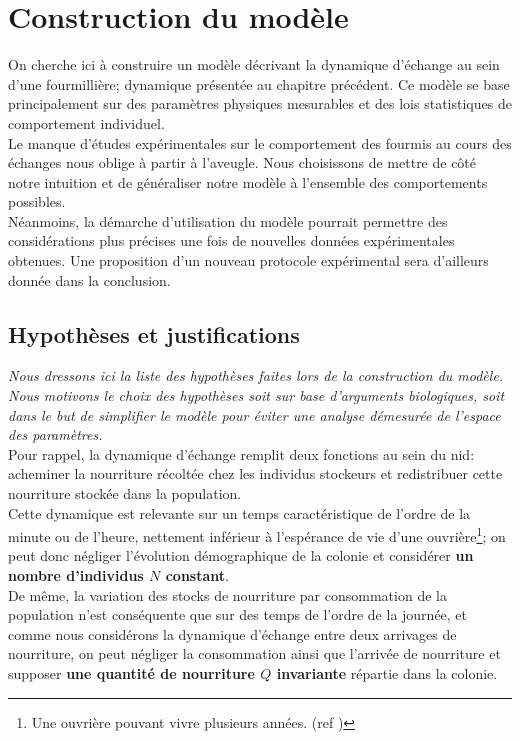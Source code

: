\chapter{Construction du modèle}

On cherche ici à construire un modèle décrivant la dynamique d'échange au sein d'une fourmillière; dynamique présentée au chapitre précédent. Ce modèle se base principalement sur des paramètres physiques mesurables et des lois statistiques de comportement individuel. \\

Le manque d'études expérimentales sur le comportement des fourmis au cours des échanges nous oblige à partir à l'aveugle. Nous choisissons de mettre de côté notre intuition et de généraliser notre modèle à l'ensemble des comportements possibles.\\

Néanmoins, la démarche d'utilisation du modèle pourrait permettre des considérations plus précises une fois de nouvelles données expérimentales obtenues. Une proposition d'un nouveau protocole expérimental sera d'ailleurs donnée dans la conclusion.


\section{Hypothèses et justifications}
\textit{Nous dressons ici la liste des hypothèses faites lors de la construction du modèle. Nous motivons le choix des hypothèses soit sur base d'arguments biologiques, soit dans le but de simplifier le modèle pour éviter une analyse démesurée de l'espace des paramètres.}\\

Pour rappel, la dynamique d'échange remplit deux fonctions au sein du nid: acheminer la nourriture récoltée chez les individus stockeurs et redistribuer cette nourriture stockée dans la population. \\

Cette dynamique est relevante sur un temps caractéristique de l'ordre de la minute ou de l'heure, nettement inférieur à l'espérance de vie d'une ouvrière\footnote{Une ouvrière pouvant vivre plusieurs années. (ref \fixme)}; on peut donc négliger l'évolution démographique de la colonie et considérer \textbf{un nombre d'individus $N$ constant}.\\

De même, la variation des stocks de nourriture par consommation de la population n'est conséquente que sur des temps de l'ordre de la journée, et comme nous considérons la dynamique d'échange entre deux arrivages de nourriture, on peut négliger la consommation ainsi que l'arrivée de nourriture et supposer \textbf{une quantité de nourriture $Q$ invariante} répartie dans la colonie.\\


